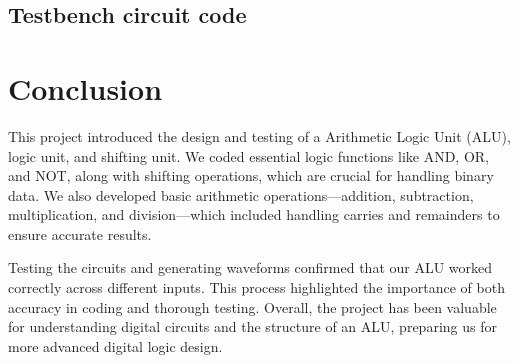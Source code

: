 \documentclass[12pt]{article}
\begin{document}
\subsection{Testbench circuit code}



\section{Conclusion}

This project introduced the design and testing of a Arithmetic Logic Unit (ALU), logic unit, and shifting unit. We coded essential logic functions like AND, OR, and NOT, along with shifting operations, which are crucial for handling binary data. We also developed basic arithmetic operations—addition, subtraction, multiplication, and division—which included handling carries and remainders to ensure accurate results.

Testing the circuits and generating waveforms confirmed that our ALU worked correctly across different inputs. This process highlighted the importance of both accuracy in coding and thorough testing. Overall, the project has been valuable for understanding digital circuits and the structure of an ALU, preparing us for more advanced digital logic design.
\end{document}
